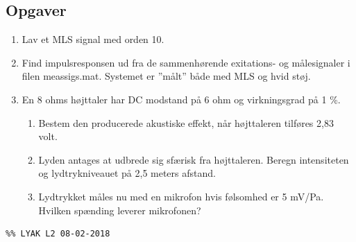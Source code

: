 \subsection{Opgaver}

\begin{enumerate}
	\item Lav et MLS signal med orden 10.
	\item Find impulsresponsen ud fra de sammenhørende exitations- og målesignaler i filen meassigs.mat. Systemet er ”målt” både med MLS og hvid støj.
	\item En 8 ohms højttaler har DC modstand på 6 ohm og virkningsgrad på 1 \%.
	\begin{enumerate}
		\item Bestem den producerede akustiske effekt, når højttaleren tilføres 2,83 volt.
		\item Lyden antages at udbrede sig sfærisk fra højttaleren. Beregn intensiteten og lydtrykniveauet på 2,5 meters afstand.
		\item Lydtrykket måles nu med en mikrofon hvis følsomhed er 5 mV/Pa. Hvilken spænding leverer mikrofonen?
	\end{enumerate}
\end{enumerate}


\begin{lstlisting}
%% LYAK L2 08-02-2018

\end{lstlisting}

